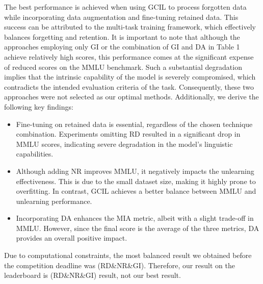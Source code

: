 \documentclass[11pt]{article}
\begin{document}
The best performance is achieved when using GCIL to process forgotten data while incorporating data augmentation and fine-tuning retained data. This success can be attributed to the multi-task training framework, which effectively balances forgetting and retention.
It is important to note that although the approaches employing only GI or the combination of GI and DA in Table 1 achieve relatively high scores, this performance comes at the significant expense of reduced scores on the MMLU benchmark. Such a substantial degradation implies that the intrinsic capability of the model is severely compromised, which contradicts the intended evaluation criteria of the task. Consequently, these two approaches were not selected as our optimal methods.
Additionally, we derive the following key findings:
\begin{itemize}
	\item Fine-tuning on retained data is essential, regardless of the chosen technique combination. Experiments omitting RD resulted in a significant drop in MMLU scores, indicating severe degradation in the model’s linguistic capabilities.
	\item Although adding NR improves MMLU, it negatively impacts the unlearning effectiveness. This is due to the small dataset size, making it highly prone to overfitting. In contrast, GCIL achieves a better balance between MMLU and unlearning performance.
	\item Incorporating DA enhances the MIA metric, albeit with a slight trade-off in MMLU. However, since the final score is the average of the three metrics, DA provides an overall positive impact.
\end{itemize}


Due to computational constraints, the most balanced result we obtained before the competition deadline was (RD\&NR\&GI). Therefore, our result on the leaderboard is (RD\&NR\&GI) result, not our best result.
\end{document}
